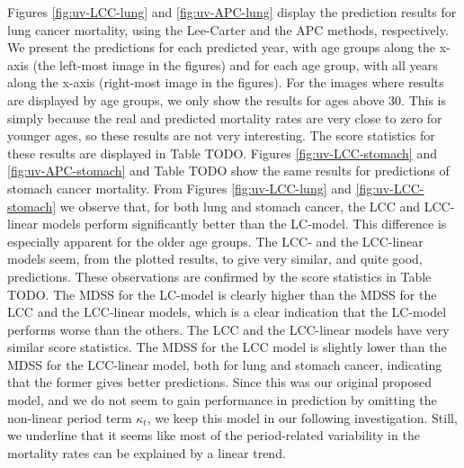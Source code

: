 Figures \ref{fig:uv-LCC-lung} and \ref{fig:uv-APC-lung} display the prediction results for lung cancer mortality, using the Lee-Carter and the APC methods, respectively. We present the predictions for each predicted year, with age groups along the x-axis (the left-most image in the figures) and for each age group, with all years along the x-axis (right-most image in the figures). For the images where results are displayed by age groups, we only show the results for ages above 30. This is simply because the real and predicted mortality rates are very close to zero for younger ages, so these results are not very interesting. The score statistics for these results are displayed in Table \textcolor{myDarkGreen}{TODO}. Figures \ref{fig:uv-LCC-stomach} and \ref{fig:uv-APC-stomach} and Table \textcolor{myDarkGreen}{TODO} show the same results for predictions of stomach cancer mortality. 
\newpar
From Figures \ref{fig:uv-LCC-lung} and \ref{fig:uv-LCC-stomach} we observe that, for both lung and stomach cancer, the LCC and LCC-linear models perform significantly better than the LC-model. This difference is especially apparent for the older age groups. The LCC- and the LCC-linear models seem, from the plotted results, to give very similar, and quite good, predictions. These observations are confirmed by the score statistics in Table \textcolor{myDarkGreen}{TODO}. The MDSS for the LC-model is clearly higher than the MDSS for the LCC and the LCC-linear models, which is a clear indication that the LC-model performs worse than the others. \textcolor{myDarkGreen}{The LCC and the LCC-linear models have very similar score statistics. The MDSS for the LCC model is slightly lower than the MDSS for the LCC-linear model, both for lung and stomach cancer, indicating that the former gives better predictions. Since this was our original proposed model, and we do not seem to gain performance in prediction by omitting the non-linear period term $\kappa_t$, we keep this model in our following investigation. Still, we underline that it seems like most of the period-related variability in the mortality rates can be explained by a linear trend. }

